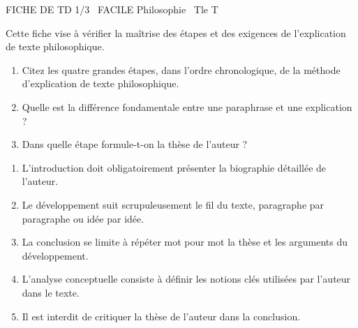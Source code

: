 \documentclass[11pt]{article}
\begin{document}
\begin{tcolorbox}[enhanced,colback=popink,colframe=popink,arc=10pt,boxrule=0pt,left=12pt,right=12pt,top=9pt,bottom=9pt]
{\color{white}\popxbold\small FICHE DE TD 1/3 \textbullet\ FACILE \hfill Philosophie \textbullet\ Tle T\par}
\end{tcolorbox}
\vspace{4pt}
Cette fiche vise à vérifier la maîtrise des étapes et des exigences de l'explication de texte philosophique.

\begin{exercice}
\begin{enumerate}
    \item Citez les quatre grandes étapes, dans l'ordre chronologique, de la méthode d'explication de texte philosophique.
    \item Quelle est la différence fondamentale entre une \og paraphrase \fg{} et une \og explication \fg{} ?
    \item Dans quelle étape formule-t-on la \og thèse \fg{} de l'auteur ?
\end{enumerate}
\end{exercice}

\begin{exercice}
\begin{enumerate}
    \item L'introduction doit obligatoirement présenter la biographie détaillée de l'auteur.
    \item Le \og développement \fg{} suit scrupuleusement le fil du texte, paragraphe par paragraphe ou idée par idée.
    \item La conclusion se limite à répéter mot pour mot la thèse et les arguments du développement.
    \item L'analyse conceptuelle consiste à définir les notions clés utilisées par l'auteur dans le texte.
    \item Il est interdit de critiquer la thèse de l'auteur dans la conclusion.
\end{enumerate}
\end{exercice}
\end{document}
